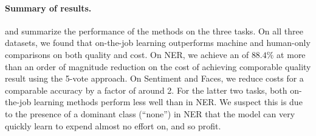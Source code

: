 \paragraph{Summary of results.}
 and  summarize the performance of the methods on the three tasks.
On all three datasets, we found that on-the-job learning outperforms machine and human-only comparisons on both quality and cost. 
On NER, we achieve an \fone{} of $88.4\%$ at more than an order of magnitude reduction on the cost of achieving comporable quality result using the 5-vote approach. On Sentiment and Faces, we reduce costs for a comparable accuracy by a factor of around 2.
For the latter two tasks, both on-the-job learning methods perform less well than in NER. We suspect this is due to the presence of a dominant class (``none'') in NER that the model can very quickly learn to expend almost no effort on, and so profit.

